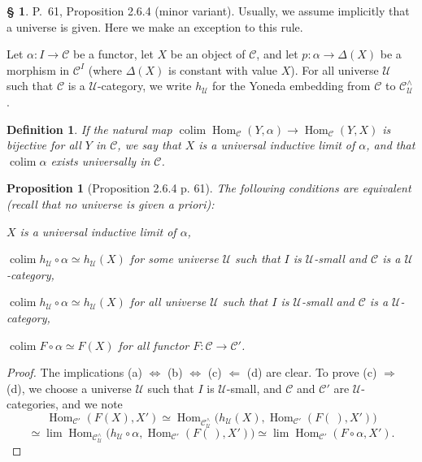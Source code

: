 \documentclass[12pt]{article}%
\newtheorem{prop}[thm]{Proposition}
\newtheorem{df}[thm]{Definition}%
\theoremstyle{remark}
\theoremstyle{definition}
\newtheorem{s}[thm]{\S}%
\newcommand{\nn}{\noindent}
\newcommand{\C}{\mathcal C}
\newcommand{\U}{\mathcal U}
\newcommand{\then}{\Rightarrow}
\newcommand{\si}{\Leftarrow}
\newcommand{\ssi}{\Leftrightarrow}%
\DeclareMathOperator*{\colim}{colim}
\DeclareMathOperator{\Hom}{Hom}%
\begin{document}
\begin{s} 
P.~61, Proposition 2.6.4 (minor variant). Usually, we assume implicitly that a universe is given. Here we make an exception to this rule. 

Let $\alpha:I\to\C$ be a functor, let $X$ be an object of $\C$, and let $p:\alpha\to\Delta(X)$ be a morphism in $\C^I$ (where $\Delta(X)$ is constant with value $X$). For all universe $\U$ such that $\C$ is a $\U$-category, we write $h_\U$ for the Yoneda embedding from $\C$ to $\C^\wedge_\U$.

\begin{df}\label{uil}
If the natural map $\colim\Hom_\C(Y,\alpha)\to\Hom_\C(Y,X)$ is bijective for all $Y$ in $\C$, we say that $X$ is a {\em universal} inductive limit  of $\alpha$, and that $\colim\alpha$ exists {\em universally}  in $\C$.
\end{df}

\begin{prop}[Proposition 2.6.4 p. 61]%
The following conditions are equivalent (recall that no universe is given {\em a priori}):

\nn{\em(a)} $X$ is a universal inductive limit of $\alpha$,

\nn{\em(b)} $\colim h_\U\circ\alpha\simeq h_\U(X)$ for some universe $\U$ such that $I$ is $\U$-small and $\C$ is a $\U$-category,

\nn{\em(c)} $\colim h_\U\circ\alpha\simeq h_\U(X)$ for all universe $\U$ such that $I$ is $\U$-small and $\C$ is a $\U$-category, 

\nn{\em(d)} $\colim F\circ\alpha\simeq F(X)$ for all functor $F:\C\to\C'$. 
\end{prop}

\begin{proof} The implications (a) $\ssi$ (b) $\ssi$ (c) $\si$ (d) are clear. To prove (c) $\then$ (d), we choose a universe $\U$ such that $I$ is $\U$-small, and $\C$ and $\C'$ are $\U$-categories, and we note
$$
\Hom_{\C'}(F(X),X')\simeq\Hom_{\C^\wedge_\U}\big(h_\U(X),\Hom_{\C'}(F(\ ),X')\big)
$$
$$
\simeq\lim\Hom_{\C^\wedge_\U}\big(h_\U\circ\alpha,\Hom_{\C'}(F(\ ),X')\big)\simeq\lim\Hom_{\C'}(F\circ\alpha,X').
$$
\end{proof}
\end{s}

%
\end{document}
